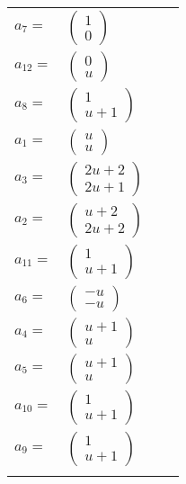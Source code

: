\documentclass[1p]{elsarticle_modified}
\theoremstyle{definition}
\begin{document}
\begin{tabular}{m{7pt} m{180pt} m{7pt} m{180pt} }
\flushright $a_{7}=$&$\begin{pmatrix}1\\0\end{pmatrix}$ \\
\flushright $a_{12}=$&$\begin{pmatrix}0\\u\end{pmatrix}$ \\
\flushright $a_{8}=$&$\begin{pmatrix}1\\u+1\end{pmatrix}$ \\
\flushright $a_{1}=$&$\begin{pmatrix}u\\u\end{pmatrix}$ \\
\flushright $a_{3}=$&$\begin{pmatrix}2 u+2\\2 u+1\end{pmatrix}$ \\
\flushright $a_{2}=$&$\begin{pmatrix}u+2\\2 u+2\end{pmatrix}$ \\
\flushright $a_{11}=$&$\begin{pmatrix}1\\u+1\end{pmatrix}$ \\
\flushright $a_{6}=$&$\begin{pmatrix}- u\\- u\end{pmatrix}$ \\
\flushright $a_{4}=$&$\begin{pmatrix}u+1\\u\end{pmatrix}$ \\
\flushright $a_{5}=$&$\begin{pmatrix}u+1\\u\end{pmatrix}$ \\
\flushright $a_{10}=$&$\begin{pmatrix}1\\u+1\end{pmatrix}$ \\
\flushright $a_{9}=$&$\begin{pmatrix}1\\u+1\end{pmatrix}$\\&\end{tabular}
\end{document}
